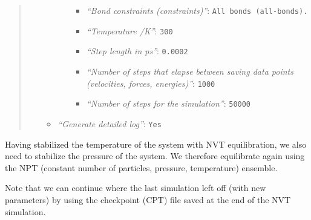 \documentclass[twocolumn]{bmcart}%
\providecommand{\tightlist}{%
  \setlength{\itemsep}{0pt}\setlength{\parskip}{0pt}}
\providecommand{\tightlist}{%
  \setlength{\itemsep}{0pt}\setlength{\parskip}{0pt}}
\begin{document}
\begin{quote}
\begin{enumerate}
\begin{itemize}
\begin{itemize}
      \begin{itemize}
      \tightlist
      \item
        \emph{``Bond constraints (constraints)''}:
        \texttt{All\ bonds\ (all-bonds).}
      \item
        \emph{``Temperature /K''}: \texttt{300}
      \item
        \emph{``Step length in ps''}: \texttt{0.0002}
      \item
        \emph{``Number of steps that elapse between saving data points
        (velocities, forces, energies)''}: \texttt{1000}
      \item
        \emph{``Number of steps for the simulation''}: \texttt{50000}
      \end{itemize}
    \end{itemize}
  \item
    \emph{``Generate detailed log''}: \texttt{Yes}
  \end{itemize}
\end{enumerate}

\end{quote}

Having stabilized the temperature of the system with NVT equilibration,
we also need to stabilize the pressure of the system. We therefore
equilibrate again using the NPT (constant number of particles, pressure,
temperature) ensemble.

Note that we can continue where the last simulation left off (with new
parameters) by using the checkpoint (CPT) file saved at the end of the
NVT simulation.
\end{document}
